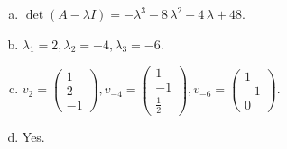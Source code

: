 \begin{questions}
\begin{solution}
\begin{enumerate}[(a)]
\item $\det(A-\lambda I)=-{\lambda}^{3} - 8 \, {\lambda}^{2} - 4 \, {\lambda} + 48$.
\item ${\lambda}_1=2, {\lambda}_2=-4, {\lambda}_3=-6$.
\item $v_{2}=\left(\begin{array}{r}
1 \\
2 \\
-1
\end{array}\right), v_{-4}=\left(\begin{array}{r}
1 \\
-1 \\
\frac{1}{2}
\end{array}\right), v_{-6}=\left(\begin{array}{r}
1 \\
-1 \\
0
\end{array}\right)$.
\item Yes.
\end{enumerate}
\end{solution}

\end{questions}

\newpage


\begin{center}
\end{center}

